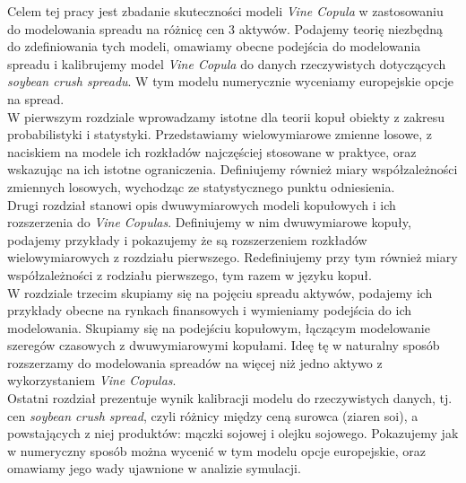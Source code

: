 \begin{wstep}[Wprowadzenie]
	Celem tej pracy jest zbadanie skuteczności modeli \emph{Vine Copula} w zastosowaniu do modelowania spreadu na różnicę cen 3 aktywów. Podajemy teorię niezbędną do zdefiniowania tych modeli, omawiamy obecne podejścia do modelowania spreadu i kalibrujemy model \emph{Vine Copula} do danych rzeczywistych dotyczących \emph{soybean crush spreadu}. W tym modelu numerycznie wyceniamy europejskie opcje na spread.\\
	
	W pierwszym rozdziale wprowadzamy istotne dla teorii kopuł obiekty z zakresu probabilistyki i statystyki. Przedstawiamy wielowymiarowe zmienne losowe, z naciskiem na modele ich rozkładów najczęściej stosowane w praktyce, oraz wskazując na ich istotne ograniczenia. Definiujemy również miary współzależności zmiennych losowych, wychodząc ze statystycznego punktu odniesienia.\\
	
	Drugi rozdział stanowi opis dwuwymiarowych modeli kopułowych i ich rozszerzenia do \emph{Vine Copulas}. Definiujemy w nim dwuwymiarowe kopuły, podajemy przykłady i pokazujemy że są rozszerzeniem rozkładów wielowymiarowych z rozdziału pierwszego. Redefiniujemy przy tym również miary współzależności z rodziału pierwszego, tym razem w języku kopuł.\\
	
	W rozdziale trzecim skupiamy się na pojęciu spreadu aktywów, podajemy ich przykłady obecne na rynkach finansowych i wymieniamy podejścia do ich modelowania. Skupiamy się na podejściu kopułowym, łączącym modelowanie szeregów czasowych z dwuwymiarowymi kopułami. Ideę tę w naturalny sposób rozszerzamy do modelowania spreadów na więcej niż jedno aktywo z wykorzystaniem \emph{Vine Copulas}.\\
	
	Ostatni rozdział prezentuje wynik kalibracji modelu do rzeczywistych danych, tj. cen \emph{soybean crush spread}, czyli różnicy między ceną surowca (ziaren soi), a powstających z niej produktów: mączki sojowej i olejku sojowego. Pokazujemy jak w numeryczny sposób można wycenić w tym modelu opcje europejskie, oraz omawiamy jego wady ujawnione w analizie symulacji.
	
\end{wstep}
